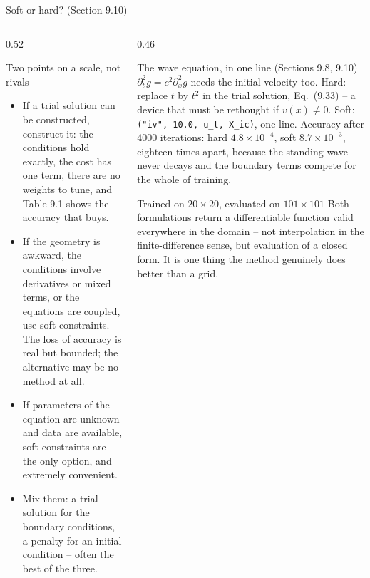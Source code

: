 \documentclass[10pt,aspectratio=169]{beamer}
\begin{document}
\begin{frame}{Soft or hard?  (Section 9.10)}
\small
\begin{columns}[T]
\begin{column}{0.52\textwidth}
\begin{block}{Two points on a scale, not rivals}
\footnotesize
\begin{itemize}
  \item If a trial solution can be constructed, construct it: the conditions
        hold exactly, the cost has one term, there are no weights to tune,
        and Table 9.1 shows the accuracy that buys.
  \item If the geometry is awkward, the conditions involve derivatives or
        mixed terms, or the equations are coupled, use soft constraints.  The
        loss of accuracy is real but bounded; the alternative may be no
        method at all.
  \item If parameters of the equation are unknown and data are available,
        soft constraints are the only option, and extremely convenient.
  \item Mix them: a trial solution for the boundary conditions, a penalty
        for an initial condition -- often the best of the three.
\end{itemize}
\end{block}
\end{column}
\begin{column}{0.46\textwidth}
\begin{block}{The wave equation, in one line (Sections 9.8, 9.10)}
\footnotesize
$\partial_t^{2}g=c^{2}\partial_x^{2}g$ needs the initial velocity too.
Hard: replace $t$ by $t^{2}$ in the trial solution, Eq.~(9.33) -- a device
that must be rethought if $v(x)\neq0$.  Soft: \texttt{("iv", 10.0, u\_t,
X\_ic)}, one line.  Accuracy after $4000$ iterations: hard
$4.8\times10^{-4}$, soft $8.7\times10^{-3}$, eighteen times apart, because
the standing wave never decays and the boundary terms compete for the whole
of training.
\end{block}
\begin{block}{Trained on $20\times20$, evaluated on $101\times101$}
\footnotesize
Both formulations return a differentiable function valid everywhere in the
domain -- not interpolation in the finite-difference sense, but evaluation
of a closed form.  It is one thing the method genuinely does better than a
grid.
\end{block}
\end{column}
\end{columns}
\end{frame}
\end{document}
